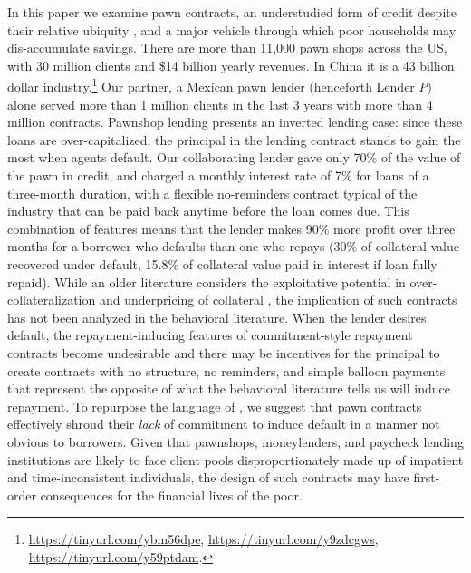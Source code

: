 \documentclass[oneside,11pt]{article}
\begin{document}
In this paper we examine pawn contracts, an understudied form of credit despite their relative ubiquity \citep{carter2012pawnshops}, and a major vehicle through which poor households may dis-accumulate savings.  There are more than 11,000 pawn shops across the US, with 30 million clients and \$14 billion yearly revenues.  In China it is a 43 billion dollar industry.\footnote{\url{https://tinyurl.com/ybm56dpe}, \url{https://tinyurl.com/y9zdcgws}, \url{https://tinyurl.com/y59ptdam}.} Our partner, a Mexican pawn lender (henceforth Lender $P$) alone served more than 1 million clients in the last 3 years with more than 4 million contracts.  Pawnshop lending presents an inverted lending case:  since these loans are over-capitalized, the principal in the lending contract stands to gain the most when agents default.  Our collaborating lender gave only 70\% of the value of the pawn in credit, and charged a monthly interest rate of 7\% for loans of a three-month duration, with a flexible no-reminders contract typical of the industry that can be paid back anytime before the loan comes due.  This combination of features means that the lender makes 90\% more profit over three months for a borrower who defaults than one who repays (30\% of collateral value recovered under default, 15.8\% of collateral value paid in interest if loan fully repaid).  While an older literature considers the exploitative potential in over-collateralization and underpricing of collateral \citep{basu1984implicit}, the implication of such contracts has not been analyzed in the behavioral literature.  When the lender desires default, the repayment-inducing features of commitment-style repayment contracts become undesirable and there may be incentives for the principal to create contracts with no structure, no reminders, and simple balloon payments that represent the opposite of what the behavioral literature tells us will induce repayment.  To repurpose the language of \cite{Laibson2018}, we suggest that pawn contracts effectively shroud their \textit{lack} of commitment to induce default in a manner not obvious to borrowers.  Given that pawnshops, moneylenders, and paycheck lending institutions are likely to face client pools disproportionately made up of impatient and time-inconsistent individuals, the design of such contracts may have first-order consequences for the financial lives of the poor.
\end{document}
